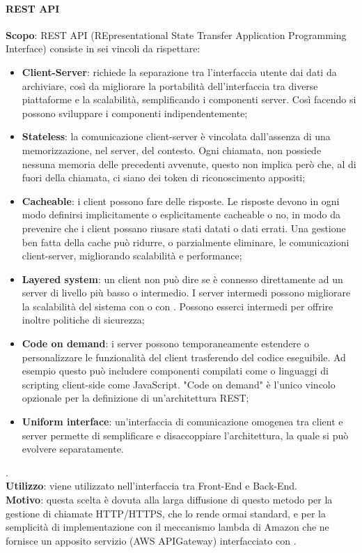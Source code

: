 \documentclass[../DefinizioneDiProdotto.tex]{subfiles}
\begin{document}
			\paragraph{REST API}\mbox{}
			\begin{addmargin}[1em]{2em}%
				\textbf{Scopo}: REST API (REpresentational State Transfer Application Programming Interface) consiste in sei vincoli da rispettare:
					\begin{itemize}
						\item \textbf{Client-Server}: richiede la separazione tra l'interfaccia utente dai dati da archiviare, così da migliorare la portabilità dell'interfaccia tra diverse piattaforme e la scalabilità, semplificando i componenti server. Così facendo si possono sviluppare i componenti indipendentemente;
						\item \textbf{Stateless}: la comunicazione client-server è vincolata dall'assenza di una memorizzazione, nel server, del contesto. Ogni chiamata, non possiede nessuna memoria delle precedenti avvenute, questo non implica però che, al di fuori della chiamata, ci siano dei token di riconoscimento appositi;
						\item \textbf{Cacheable}:  i client possono fare  delle risposte. Le risposte devono in ogni modo definirsi implicitamente o esplicitamente cacheable o no, in modo da prevenire che i client possano riusare stati datati o dati errati. Una gestione ben fatta della cache può ridurre, o parzialmente eliminare, le comunicazioni client-server, migliorando scalabilità e performance;
						\item \textbf{Layered system}: un client non può dire se è connesso direttamente ad un server di livello più basso o intermedio. I server intermedi possono migliorare la scalabilità del sistema con  o con . Possono esserci  intermedi per offrire inoltre politiche di sicurezza;
						\item \textbf{Code on demand}:  i server possono temporaneamente estendere o personalizzare le funzionalità del client trasferendo del codice eseguibile. Ad esempio questo può includere componenti compilati come  o linguaggi di scripting client-side come JavaScript. "Code on demand" è l'unico vincolo opzionale per la definizione di un'architettura REST;
						\item \textbf{Uniform interface}: un'interfaccia di comunicazione omogenea tra client e server permette di semplificare e disaccoppiare l'architettura, la quale si può evolvere separatamente.
					\end{itemize}.\\
				\textbf{Utilizzo}: viene utilizzato nell'interfaccia tra Front-End e Back-End.\\
				\textbf{Motivo}: questa scelta è dovuta alla larga diffusione di questo metodo per la gestione di chiamate HTTP/HTTPS, che lo rende ormai standard, e per la semplicità di implementazione con il meccanismo lambda di Amazon che ne fornisce un apposito servizio (AWS APIGateway) interfacciato con .

			\end{addmargin}
\end{document}
